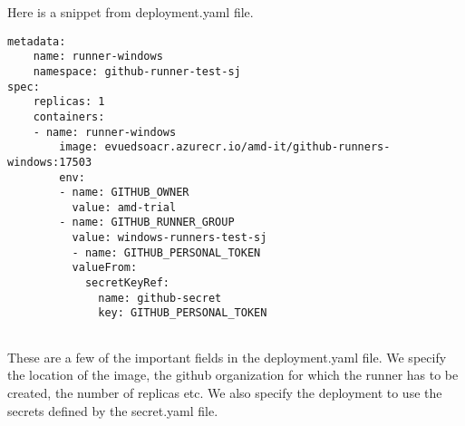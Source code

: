 Here is a snippet from deployment.yaml file.
\begin{lstlisting}[breaklines]
metadata:
	name: runner-windows
	namespace: github-runner-test-sj
spec:
	replicas: 1
	containers:
	- name: runner-windows
        image: evuedsoacr.azurecr.io/amd-it/github-runners-windows:17503
        env:
        - name: GITHUB_OWNER
          value: amd-trial
        - name: GITHUB_RUNNER_GROUP
          value: windows-runners-test-sj
          - name: GITHUB_PERSONAL_TOKEN 
          valueFrom:
            secretKeyRef:
              name: github-secret
              key: GITHUB_PERSONAL_TOKEN
	
\end{lstlisting}
These are a few of the important fields in the deployment.yaml file. We specify the location of the image, the github organization for which the runner has to be created, the number of replicas etc.
We also specify the deployment to use the secrets defined by the secret.yaml file.



